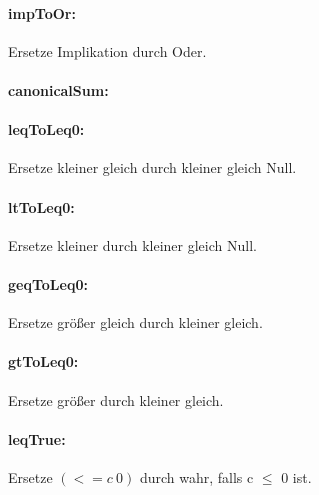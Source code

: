 \documentclass[a4paper]{article}
\begin{document}
\paragraph{impToOr:} Ersetze Implikation durch Oder.
\begin{mathpar}
\end{mathpar}
\paragraph{canonicalSum:}
\paragraph{leqToLeq0:} Ersetze kleiner gleich durch kleiner gleich Null.
\begin{mathpar}
\end{mathpar}
\paragraph{ltToLeq0:} Ersetze kleiner durch kleiner gleich Null.
\begin{mathpar}
\end{mathpar}
\paragraph{geqToLeq0:} Ersetze größer gleich durch kleiner gleich.
\begin{mathpar}
\end{mathpar}
\paragraph{gtToLeq0:} Ersetze größer durch kleiner gleich.
\begin{mathpar}
\end{mathpar}
\paragraph{leqTrue:} Ersetze $(<= c\ 0)$ durch wahr, falls c $\leq$ 0 ist.
\begin{mathpar}
\end{mathpar}
\end{document}
